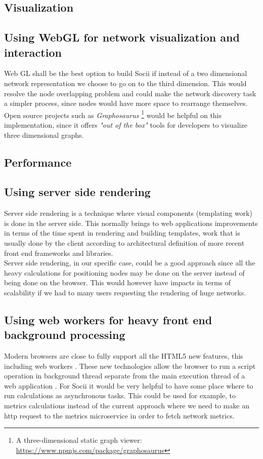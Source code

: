 \subsection{Visualization}

\subsection*{Using WebGL for network visualization and interaction}
Web GL \citep{marrin2011webgl} shall be the best option to build Socii if instead of a two dimensional network representation we choose to go on to the third dimension. This would resolve the node overlapping problem and could make the network discovery task a simpler process, since nodes would have more space to rearrange themselves. Open source projects such as \emph{Graphosaurus} \footnote{A three-dimensional static graph viewer: \url{https://www.npmjs.com/package/graphosaurus}} would be helpful on this implementation, since it offers \textit{"out of the box"} tools for developers to visualize three dimensional graphs.

\subsection{Performance}

\subsection*{Using server side rendering}
Server side rendering is a technique where visual components (templating work) is done in the server side. This normally brings to web applications improvements in terms of the time spent in rendering and building templates, work that is usually done by the client according to architectural definition of more recent front end frameworks and libraries.\\
\indent Server side rendering, in our specific case, could be a good approach since all the heavy calculations for positioning nodes
may be done on the server instead of being done on the browser. This would however have impacts in terms of scalability if we had to many users requesting
the rendering of huge networks.

\subsection*{Using web workers for heavy front end background processing}
Modern browsers are close to fully support all the HTML5 new features, this including web workers \citep{webworkers}. These new technologies allow
the browser to run a script operation in background thread separate from the main execution thread of a web application \citep{mdnwebworkers}. For Socii it would be very helpful to have some place where to run calculations as asynchronous tasks. This could be used for example, to metrics calculations instead of the current approach where we need to make an http request to the metrics microservice in order to fetch network metrics.


